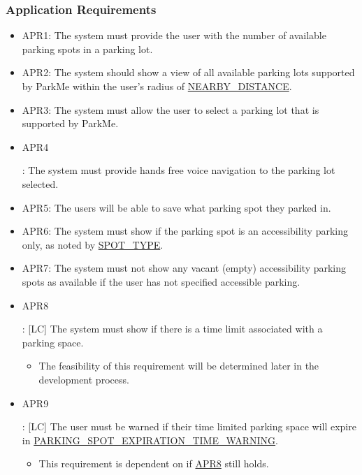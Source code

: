 \documentclass[]{article}
\begin{document}
	\subsubsection{Application Requirements}
	\begin{itemize}
		\item APR1: The system must provide the user with the number of available parking spots in a parking lot.
		
		\item APR2: The system should show a view of all available parking lots supported by ParkMe within the user's radius of \hyperlink{NBDST}{NEARBY\_DISTANCE}.

		
		\item APR3: The system must allow the user to select a parking lot that is supported by ParkMe.
	
		\item \hypertarget{APR4}{APR4}: The system must provide hands free voice navigation to the parking lot selected.

		
		
		\item APR5: The users will be able to save what parking spot they parked in.
		
		\item APR6: The system must show if the parking spot is an accessibility parking only, as noted by \hyperlink{PSTYPE}{SPOT\_TYPE}.
		
		\item APR7: The system must not show any vacant (empty) accessibility parking spots as available if the user has not specified accessible parking.
		
		\item \hypertarget{APR8}{APR8}: [LC] The system must show if there is a time limit associated with a parking space.
		\begin{itemize}
			\item The feasibility of this requirement will be determined later in the development process.
		\end{itemize}
	
		\item \hypertarget{APR9}{APR9}: [LC] The user must be warned if their time limited parking space will expire in \hyperlink{EXPTIME}{PARKING\_SPOT\_EXPIRATION\_TIME\_WARNING}.
		\begin{itemize}
			\item This requirement is dependent on if \hyperlink{APR8}{APR8} still holds.
		\end{itemize}
		

\end{itemize}
\end{document}
